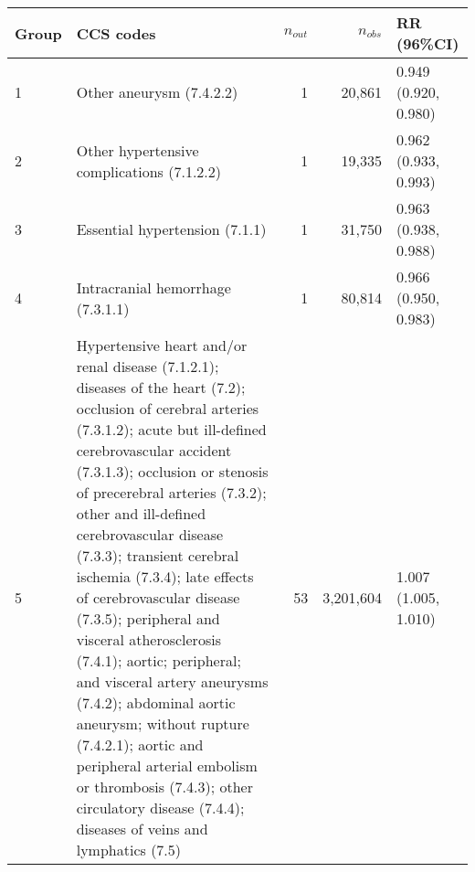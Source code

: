 \begin{tabular}{lp{6.5cm}rrp{2.2cm}}
  \hline
Group & CCS codes & $n_{out}$ & $n_{obs}$ & RR (96\%CI) \\ 
  \hline
   1 & Other aneurysm (7.4.2.2) &    1 & 20,861 & 0.949 (0.920, 0.980) \\ 
     2 & Other hypertensive complications (7.1.2.2) &    1 & 19,335 & 0.962 (0.933, 0.993) \\ 
     3 & Essential hypertension (7.1.1) &    1 & 31,750 & 0.963 (0.938, 0.988) \\ 
     4 & Intracranial hemorrhage (7.3.1.1) &    1 & 80,814 & 0.966 (0.950, 0.983) \\ 
     5 & Hypertensive heart and/or renal disease (7.1.2.1); diseases of the heart (7.2); occlusion of cerebral arteries (7.3.1.2); acute but ill-defined cerebrovascular accident (7.3.1.3); occlusion or stenosis of precerebral arteries (7.3.2); other and ill-defined cerebrovascular disease (7.3.3); transient cerebral ischemia (7.3.4); late effects of cerebrovascular disease (7.3.5); peripheral and visceral atherosclerosis (7.4.1); aortic; peripheral; and visceral artery aneurysms (7.4.2); abdominal aortic aneurysm; without rupture (7.4.2.1); aortic and peripheral arterial embolism or thrombosis (7.4.3); other circulatory disease (7.4.4); diseases of veins and lymphatics (7.5) &   53 & 3,201,604 & 1.007 (1.005, 1.010) \\ 
   \hline
\end{tabular}

